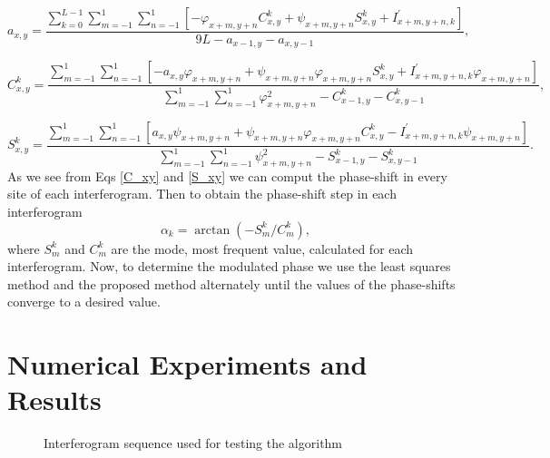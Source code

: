 \documentclass[letterpaper,12pt]{article}   %
\begin{document}
\begin{equation}
a_{x,y} = \frac{ \sum_{k=0}^{L-1} \sum_{m=-1}^{1} \sum_{n=-1}^{1} \left[ -\varphi_{x+m,y+n}C_{x,y}^k+\psi_{x+m,y+n}S_{x,y}^k+I_{x+m,y+n,k}^{'} \right] } { 9L - a_{x-1,y}-a_{x,y-1}},
\end{equation}

\begin{equation}\label{C_xy}
C_{x,y}^k = \frac{ \sum_{m=-1}^{1} \sum_{n=-1}^{1} \left[ -a_{x,y} \varphi_{x+m,y+n}+ \psi_{x+m,y+n} \varphi_{x+m,y+n} S_{x,y}^k + I_{x+m,y+n,k}^{'} \varphi_{x+m,y+n} \right] } { \sum_{m=-1}^{1} \sum_{n=-1}^{1} \varphi_{x+m,y+n}^2 -C_{x-1,y}^k-C_{x,y-1}^k },
\end{equation}

\begin{equation}\label{S_xy}
S_{x,y}^k = \frac{ \sum_{m=-1}^{1} \sum_{n=-1}^{1} \left[ a_{x,y} \psi_{x+m,y+n} + \psi_{x+m,y+n} \varphi_{x+m,y+n} C_{x,y}^k - I_{x+m,y+n,k}^{'} \psi_{x+m,y+n} \right] } { \sum_{m=-1}^{1} \sum_{n=-1}^{1} \psi_{x+m,y+n}^2 - S_{x-1,y}^k - S_{x,y-1}^k }.
\end{equation}
As we see from Eqs \ref{C_xy} and \ref{S_xy} we can comput the phase-shift in every site of each interferogram. Then to obtain the phase-shift step in each interferogram
\begin{equation}
\alpha_k = \arctan(-S_m^k/C_m^k),
\end{equation}
where $S_m^k$ and $C_m^k$ are the mode, most frequent value, calculated for each interferogram.
Now, to determine the modulated phase we use the least squares method and the proposed method alternately until the values ​​of the phase-shifts converge to a desired value.


\section{Numerical Experiments and Results}

\begin{figure}[t]
	\begin{center}
	\end{center}
	\caption{Interferogram sequence used for testing the algorithm} 
	\label{fig:Interferograms}
\end{figure}
\end{document}
